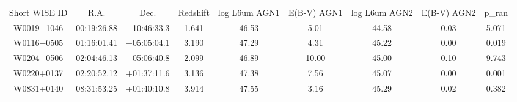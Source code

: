 \begin{table}
\begin{tabular}{ccccccccc}
Short WISE ID & R.A. & Dec. & Redshift & log L6um AGN1 & E(B-V) AGN1 & log L6um AGN2 & E(B-V) AGN2 & p_ran \\
W0019$-$1046 & 00:19:26.88 & $-$10:46:33.3 & 1.641 & 46.53 & 5.01 & 44.58 & 0.03 & 5.071 \\
W0116$-$0505 & 01:16:01.41 & $-$05:05:04.1 & 3.190 & 47.29 & 4.31 & 45.22 & 0.00 & 0.019 \\
W0204$-$0506 & 02:04:46.13 & $-$05:06:40.8 & 2.099 & 46.89 & 10.00 & 45.00 & 0.10 & 9.743 \\
W0220+0137 & 02:20:52.12 & +01:37:11.6 & 3.136 & 47.38 & 7.56 & 45.07 & 0.00 & 0.001 \\
W0831+0140 & 08:31:53.25 & +01:40:10.8 & 3.914 & 47.55 & 3.16 & 45.29 & 0.02 & 0.382 \\
\end{tabular}
\end{table}
